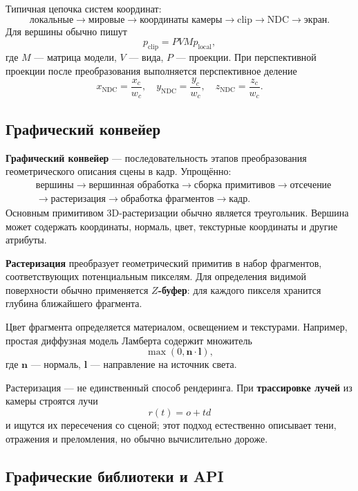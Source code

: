 Типичная цепочка систем координат:
\[
\text{локальные}
\rightarrow
\text{мировые}
\rightarrow
\text{координаты камеры}
\rightarrow
\text{clip}
\rightarrow
\text{NDC}
\rightarrow
\text{экран}.
\]
Для вершины обычно пишут
\[
p_{\mathrm{clip}}=PVMp_{\mathrm{local}},
\]
где $M$ --- матрица модели, $V$ --- вида, $P$ --- проекции. При перспективной проекции после преобразования выполняется перспективное деление
\[
x_{\mathrm{NDC}}=\frac{x_c}{w_c},\quad
 y_{\mathrm{NDC}}=\frac{y_c}{w_c},\quad
 z_{\mathrm{NDC}}=\frac{z_c}{w_c}.
\]

\subsection{Графический конвейер}

\textbf{Графический конвейер} --- последовательность этапов преобразования геометрического описания сцены в кадр. Упрощённо:
\[
\begin{split}
&\text{вершины}
\rightarrow \text{вершинная обработка}
\rightarrow \text{сборка примитивов}
\rightarrow \text{отсечение}\\
&\rightarrow \text{растеризация}
\rightarrow \text{обработка фрагментов}
\rightarrow \text{кадр}.
\end{split}
\]
Основным примитивом 3D-растеризации обычно является треугольник. Вершина может содержать координаты, нормаль, цвет, текстурные координаты и другие атрибуты.

\textbf{Растеризация} преобразует геометрический примитив в набор фрагментов, соответствующих потенциальным пикселям. Для определения видимой поверхности обычно применяется \textbf{$Z$-буфер}: для каждого пикселя хранится глубина ближайшего фрагмента.

Цвет фрагмента определяется материалом, освещением и текстурами. Например, простая диффузная модель Ламберта содержит множитель
\[
\max(0,\mathbf n\cdot\mathbf l),
\]
где $\mathbf n$ --- нормаль, $\mathbf l$ --- направление на источник света.

Растеризация --- не единственный способ рендеринга. При \textbf{трассировке лучей} из камеры строятся лучи
\[
r(t)=o+td
\]
и ищутся их пересечения со сценой; этот подход естественно описывает тени, отражения и преломления, но обычно вычислительно дороже.

\subsection{Графические библиотеки и API}

